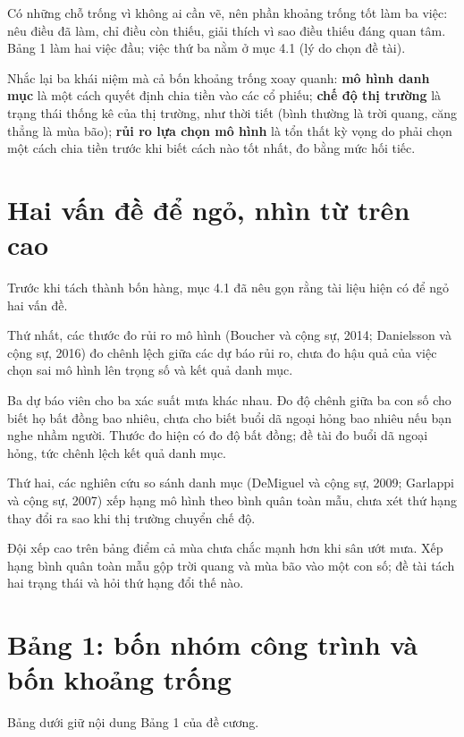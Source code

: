 Có những chỗ trống vì không ai cần vẽ, nên phần khoảng trống tốt làm ba việc: nêu điều đã làm, chỉ điều còn thiếu, giải thích vì sao điều thiếu đáng quan tâm. Bảng 1 làm hai việc đầu; việc thứ ba nằm ở mục 4.1 (lý do chọn đề tài).

Nhắc lại ba khái niệm mà cả bốn khoảng trống xoay quanh: \textbf{mô hình danh mục} là một cách quyết định chia tiền vào các cổ phiếu; \textbf{chế độ thị trường} là trạng thái thống kê của thị trường, như thời tiết (bình thường là trời quang, căng thẳng là mùa bão); \textbf{rủi ro lựa chọn mô hình} là tổn thất kỳ vọng do phải chọn một cách chia tiền trước khi biết cách nào tốt nhất, đo bằng mức hối tiếc.

\section{Hai vấn đề để ngỏ, nhìn từ trên cao}

Trước khi tách thành bốn hàng, mục 4.1 đã nêu gọn rằng tài liệu hiện có để ngỏ hai vấn đề.

Thứ nhất, các thước đo rủi ro mô hình (Boucher và cộng sự, 2014; Danielsson và cộng sự, 2016) đo chênh lệch giữa các dự báo rủi ro, chưa đo hậu quả của việc chọn sai mô hình lên trọng số và kết quả danh mục.

Ba dự báo viên cho ba xác suất mưa khác nhau. Đo độ chênh giữa ba con số cho biết họ bất đồng bao nhiêu, chưa cho biết buổi dã ngoại hỏng bao nhiêu nếu bạn nghe nhầm người. Thước đo hiện có đo độ bất đồng; đề tài đo buổi dã ngoại hỏng, tức chênh lệch kết quả danh mục.

Thứ hai, các nghiên cứu so sánh danh mục (DeMiguel và cộng sự, 2009; Garlappi và cộng sự, 2007) xếp hạng mô hình theo bình quân toàn mẫu, chưa xét thứ hạng thay đổi ra sao khi thị trường chuyển chế độ.

Đội xếp cao trên bảng điểm cả mùa chưa chắc mạnh hơn khi sân ướt mưa. Xếp hạng bình quân toàn mẫu gộp trời quang và mùa bão vào một con số; đề tài tách hai trạng thái và hỏi thứ hạng đổi thế nào.

\section{Bảng 1: bốn nhóm công trình và bốn khoảng trống}

Bảng dưới giữ nội dung Bảng 1 của đề cương.

